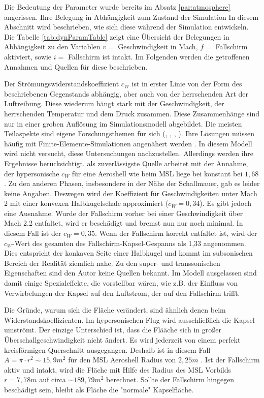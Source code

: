 Die Bedeutung der Parameter wurde bereits im Absatz \ref{par:atmosphere} angerissen. Ihre Belegung in Abhängigkeit zum Zustand der Simulation In diesem Abschnitt wird beschrieben, wie sich diese während der Simulation entwickeln. Die Tabelle \ref{tab:dynParamTable} zeigt eine Übersicht der Belegungen in Abhängigkeit zu den Variablen $v = $ Geschwindigkeit in Mach, $f =$ Fallschirm aktiviert, sowie $i =$ Fallschirm ist intakt. Im Folgenden werden die getroffenen Annahmen und Quellen für diese beschrieben.



Der Strömungswiderstandskoeffizient $c_W$ ist in erster Linie von der Form des beschriebenen Gegenstands abhängig, aber auch von der herrschenden Art der Luftreibung. Diese wiederum hängt stark mit der Geschwindigkeit, der herrschenden Temperatur und dem Druck zusammen. Diese Zusammenhänge sind nur in einer groben Auflösung im Simulationsmodell abgebildet. Die meisten Teilaspekte sind eigene Forschungsthemen für sich (\cite{Blanchard1980}, \cite{Edquist2009}, \cite{Theisinger2009}, \cite{Yamada2009}). Ihre Lösungen müssen häufig mit Finite-Elemente-Simulationen angenähert werden \cite{Edquist2009}. In diesem Modell wird nicht versucht, diese Untersuchungen nachzustellen. Allerdings werden ihre Ergebnisse berücksichtigt. \cite{Wells2000} als zuverlässigste Quelle arbeitet mit der Annahme, der hypersonische $c_W$ für eine Aeroshell wie beim MSL liege bei konstant bei $1,68$. Zu den anderen Phasen, insbesondere in der Nähe der Schallmauer, gab es leider keine Angaben. Deswegen wird der Koeffizient für Geschwindigkeiten unter Mach 2 mit einer konvexen Halbkugelschale approximiert ($c_W = 0,34$). Es gibt jedoch eine Ausnahme. Wurde der Fallschirm vorher bei einer Geschwindigkeit über Mach 2.2 \cite{Way2007} \cite{Edquist2009} entfaltet, wird er beschädigt und bremst nun nur noch minimal. In diesem Fall ist der $c_W = 0,35$. Wenn der Fallschirm korrekt entfaltet ist, wird der $c_W$-Wert des gesamten des Fallschirm-Kapsel-Gespanns als 1,33 angenommen. Dies entspricht der konkaven Seite einer Halbkugel und kommt im subsonischen Bereich der Realität ziemlich nahe. Zu den super- und transsonischen Eigenschaften sind den Autor keine Quellen bekannt. Im Modell ausgelassen sind damit einige Spezialeffekte, die vorstellbar wären, wie z.B. der Einfluss von Verwirbelungen der Kapsel auf den Luftstrom, der auf den Fallschirm trifft.

Die Gründe, warum sich die Fläche verändert, sind ähnlich denen beim Widerstandskoeffizienten. Im hypersonischen Flug wird ausschließlich die Kapsel umströmt. Der einzige Unterschied ist, dass die Flääche sich in großer Überschallgeschwindigkeit nicht ändert. Es wird jederzeit von einem perfekt kreisförmigen Querschnitt ausgegangen. Deshalb ist in diesem Fall $ A = \pi \cdot r^2 \sim 15,9m^2$ für den MSL Aeroshell Radius von $2,25m$ \cite{Edquist2009}. Ist der Fallschirm aktiv und intakt, wird die Fläche mit Hilfe des Radius des MSL Vorbilds $ r = 7,78m $ \cite{NASA/JPL2009} auf circa $\sim 189,79m^2$ berechnet. Sollte der Fallschirm hingegen beschädigt sein, bleibt als Fläche die "normale" Kapselfläche.

